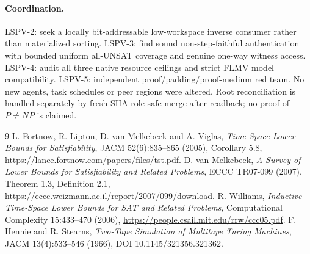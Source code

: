 \documentclass[11pt]{article}
\begin{document}
\paragraph{Coordination.} LSPV-2: seek a locally bit-addressable
low-workspace inverse consumer rather than materialized sorting.
LSPV-3: find sound non-step-faithful authentication with bounded
uniform all-UNSAT coverage and genuine one-way witness access.
LSPV-4: audit all three native resource ceilings and strict FLMV
model compatibility. LSPV-5: independent proof/padding/proof-medium
red team. No new agents, task schedules or peer regions were altered.
Root reconciliation is handled separately by fresh-SHA role-safe merge
after readback; no proof of $P\ne NP$ is claimed.

\begin{thebibliography}{9}
 L. Fortnow, R. Lipton, D. van Melkebeek and A. Viglas,
\emph{Time-Space Lower Bounds for Satisfiability}, JACM 52(6):835--865
(2005), Corollary 5.8,
\url{https://lance.fortnow.com/papers/files/tst.pdf}.
 D. van Melkebeek,
\emph{A Survey of Lower Bounds for Satisfiability and Related Problems},
ECCC TR07-099 (2007), Theorem 1.3, Definition 2.1,
\url{https://eccc.weizmann.ac.il/report/2007/099/download}.
 R. Williams,
\emph{Inductive Time-Space Lower Bounds for SAT and Related Problems},
Computational Complexity 15:433--470 (2006),
\url{https://people.csail.mit.edu/rrw/ccc05.pdf}.
 F. Hennie and R. Stearns,
\emph{Two-Tape Simulation of Multitape Turing Machines},
JACM 13(4):533--546 (1966), DOI 10.1145/321356.321362.
\end{thebibliography}
\end{document}
